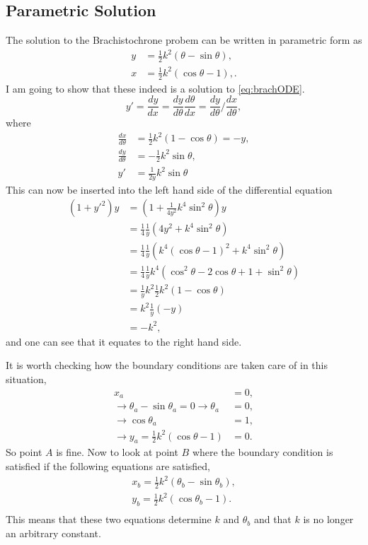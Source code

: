 \documentclass[11pt]{amsart}
\begin{document}
\subsection{Parametric Solution}
The solution to the Brachistochrone probem can be written in parametric form as
\begin{align}
y &= \frac{1}{2}k^2(\theta-\sin\theta), \label{eq:brachsol1} \\
x &= \frac{1}{2}k^2(\cos\theta - 1), \label{eq:brachsol2}.
\end{align}
I am going to show that these indeed is a solution to \ref{eq:brachODE}.
\begin{equation*}
y' = \frac{dy}{dx} = \frac{dy}{d\theta}\frac{d\theta}{dx} = \frac{dy}{d\theta}/\frac{dx}{d\theta},
\end{equation*}
where
\begin{align*}
\frac{dx}{d\theta} &= \frac{1}{2}k^2(1-\cos\theta) = -y, \\
\frac{dy}{d\theta} &= -\frac{1}{2}k^2\sin\theta, \\
y' &= \frac{1}{2y}k^2\sin\theta
\end{align*}
This can now be inserted into the left hand side of the differential equation
\begin{align*}
(1 + y'^2)y &= (1+\frac{1}{4y^2}k^4\sin^2\theta)y \\ 
			&= \frac{1}{4}\frac{1}{y}(4y^2+k^4\sin^2\theta) \\
			&= \frac{1}{4}\frac{1}{y}(k^4(\cos\theta-1)^2 + k^4\sin^2\theta) \\
			&= \frac{1}{4}\frac{1}{y}k^4(\cos^2\theta - 2\cos\theta + 1 + \sin^2\theta) \\
			&= \frac{1}{y}k^2\frac{1}{2}k^2(1-\cos\theta) \\
			&= k^2\frac{1}{y}(-y) \\
			&= -k^2,
\end{align*}
and one can see that it equates to the right hand side.

It is worth checking how the  boundary conditions are taken care of in this situation,
\begin{align*}
x_a &= 0, \\
 \rightarrow \theta_a - \sin\theta_a = 0 \rightarrow \theta_a &= 0, \\
\rightarrow \cos\theta_a &= 1, \\
 \rightarrow y_a = \frac{1}{2}k^2(\cos\theta-1) &= 0.
\end{align*}
So point $A$ is fine. Now to look at point $B$ where the boundary condition is satisfied if the following equations are satisfied,
\begin{align*}
x_b = \frac{1}{2}k^2(\theta_b-\sin\theta_b), \\
y_b = \frac{1}{2}k^2(\cos\theta_b-1). \\
\end{align*}
This means that these two equations determine $k$ and $\theta_b$ and that $k$ is no longer an arbitrary constant.
\end{document}
